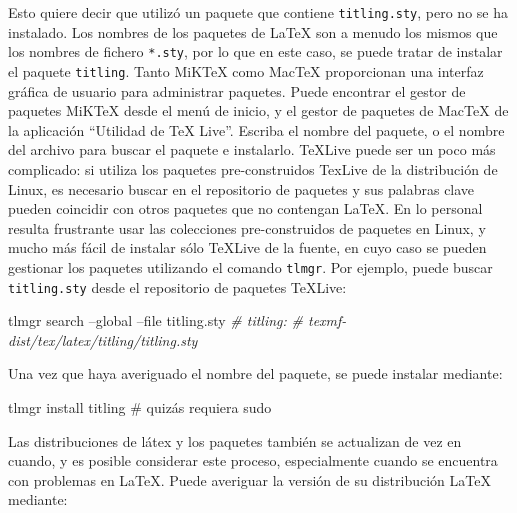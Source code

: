 \documentclass[12pt,]{krantz}
\makeatletter
\newenvironment{Shaded}{\begin{snugshade}}{\end{snugshade}}
\newcommand{\CommentTok}[1]{\textcolor[rgb]{0.56,0.35,0.01}{\textit{#1}}}
\newcommand{\ExtensionTok}[1]{#1}
\newcommand{\NormalTok}[1]{#1}
\newenvironment{kframe}{%
\medskip{}
\setlength{\fboxsep}{.8em}
 \def\at@end@of@kframe{}%
 \ifinner\ifhmode%
  \def\at@end@of@kframe{\end{minipage}}%
  \begin{minipage}{\columnwidth}%
 \fi\fi%
 \def\FrameCommand##1{\hskip\@totalleftmargin \hskip-\fboxsep
 \colorbox{shadecolor}{##1}\hskip-\fboxsep
     \hskip-\linewidth \hskip-\@totalleftmargin \hskip\columnwidth}%
 \MakeFramed {\advance\hsize-\width
   \@totalleftmargin\z@ \linewidth\hsize
   \@setminipage}}%
 {\par\unskip\endMakeFramed%
 \at@end@of@kframe}
\renewenvironment{Shaded}{\begin{kframe}}{\end{kframe}}
\theoremstyle{definition}
\theoremstyle{definition}
\theoremstyle{definition}
\theoremstyle{remark}
\makeatother
\begin{document}
Esto quiere decir que utilizó un paquete que contiene
\texttt{titling.sty}, pero no se ha instalado. Los nombres de los
paquetes de LaTeX son a menudo los mismos que los nombres de fichero
\texttt{*.sty}, por lo que en este caso, se puede tratar de instalar el
paquete \texttt{titling}. Tanto MiKTeX como MacTeX proporcionan una
interfaz gráfica de usuario para administrar paquetes. Puede encontrar
el gestor de paquetes MiKTeX desde el menú de inicio, y el gestor de
paquetes de MacTeX de la aplicación ``Utilidad de TeX Live''. Escriba el
nombre del paquete, o el nombre del archivo para buscar el paquete e
instalarlo. TeXLive puede ser un poco más complicado: si utiliza los
paquetes pre-construidos TexLive de la distribución de Linux, es
necesario buscar en el repositorio de paquetes y sus palabras clave
pueden coincidir con otros paquetes que no contengan LaTeX. En lo
personal resulta frustrante usar las colecciones pre-construidos de
paquetes en Linux, y mucho más fácil de instalar sólo TeXLive de la
fuente, en cuyo caso se pueden gestionar los paquetes utilizando el
comando \texttt{tlmgr}. Por ejemplo, puede buscar \texttt{titling.sty}
desde el repositorio de paquetes TeXLive:

\begin{Shaded}
\begin{Highlighting}[]
\ExtensionTok{tlmgr}\NormalTok{ search --global --file titling.sty}
\CommentTok{# titling:}
\CommentTok{#    texmf-dist/tex/latex/titling/titling.sty}
\end{Highlighting}
\end{Shaded}

Una vez que haya averiguado el nombre del paquete, se puede instalar
mediante:

\begin{Shaded}
\begin{Highlighting}[]
\ExtensionTok{tlmgr}\NormalTok{ install titling  # quizás requiera sudo}
\end{Highlighting}
\end{Shaded}

Las distribuciones de látex y los paquetes también se actualizan de vez
en cuando, y es posible considerar este proceso, especialmente cuando se
encuentra con problemas en LaTeX. Puede averiguar la versión de su
distribución LaTeX mediante:
\end{document}
